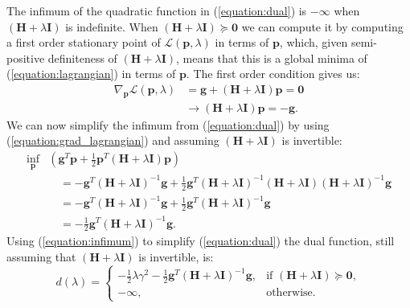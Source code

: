 \documentclass[letterpaper,12pt,titlepage,oneside,final]{book}
\begin{document}
	The infimum of the quadratic function in (\ref{equation:dual}) is $-\infty$ when $(\mathbf{H} + \lambda\mathbf{I})$ is indefinite. When $(\mathbf{H} + \lambda\mathbf{I}) \succeq \mathbf{0}$ we can compute it by computing a first order stationary point of $\mathcal{L}(\mathbf{p},\lambda)$ in terms of $\mathbf{p}$, which, given semi-positive definiteness of $(\mathbf{H} + \lambda\mathbf{I})$, means that this is a global minima of (\ref{equation:lagrangian}) in terms of $\mathbf{p}$. The first order condition gives us:
	\begin{equation}
	\begin{aligned}
	\nabla_{\mathbf{p}} \mathcal{L}(\mathbf{p},\lambda) & = \mathbf{g} + (\mathbf{H} + \lambda\mathbf{I}) \mathbf{p} = \mathbf{0} \\
	& \rightarrow (\mathbf{H} + \lambda\mathbf{I})\mathbf{p} = -\mathbf{g}.
	\end{aligned}
	\label{equation:grad_lagrangian}
	\end{equation}
	We can now simplify the infimum from (\ref{equation:dual}) by using (\ref{equation:grad_lagrangian}) and assuming $(\mathbf{H} + \lambda \mathbf{I})$ is invertible:
	\begin{equation}
	\begin{aligned}
	\underset{\mathbf{p}}{\inf}
	&(\mathbf{g}^{T}\mathbf{p} + \frac{1}{2}\mathbf{p}^{T}(\mathbf{H} + \lambda\mathbf{I})\mathbf{p}) \\ & \quad = -\mathbf{g}^{T}(\mathbf{H} + \lambda\mathbf{I})^{-1}\mathbf{g} + \frac{1}{2}\mathbf{g}^{T}(\mathbf{H} + \lambda\mathbf{I})^{-1}(\mathbf{H} + \lambda\mathbf{I})(\mathbf{H} + \lambda\mathbf{I})^{-1}\mathbf{g}   \\
	& \quad = -\mathbf{g}^{T}(\mathbf{H} + \lambda\mathbf{I})^{-1}\mathbf{g} + \frac{1}{2}\mathbf{g}^{T}(\mathbf{H} + \lambda\mathbf{I})^{-1}\mathbf{g} \\
	& \quad = - \frac{1}{2}\mathbf{g}^{T}(\mathbf{H} + \lambda\mathbf{I})^{-1}\mathbf{g}.
	\end{aligned}
	\label{equation:infimum}
	\end{equation}
	 Using (\ref{equation:infimum}) to simplify (\ref{equation:dual}) the dual function, still assuming that $(\mathbf{H} + \lambda\mathbf{I})$ is invertible, is:
	\begin{equation}
	d(\lambda)= 
	\begin{cases}
	-\frac{1}{2}\lambda\gamma^{2} - \frac{1}{2}\mathbf{g}^{T}(\mathbf{H} + \lambda\mathbf{I})^{-1}\mathbf{g} ,& \text{if } (\mathbf{H} + \lambda\mathbf{I}) \succeq \mathbf{0},\\
	-\infty,              & \text{otherwise}.
	\end{cases}
	\label{equation:g_fun}
	\end{equation}
\end{document}
